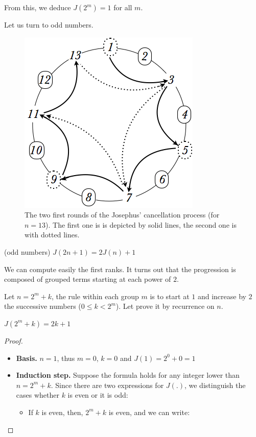 {{From this, we deduce $J(2^m)=1$ for all $m$.
\medskip

Let us turn to odd numbers.
\begin{figure}[h]
\begin{center}
        \includegraphics[scale=0.4]{FiguresMaths/josephus13}
        \caption{The two first rounds of the Josephus' cancellation process (for $n=13$).
        The first one is is depicted by solid lines, the second one is with dotted lines.}
        \label{fig:josephus13}
\end{center}
\end{figure}
\medskip

\begin{prop} (odd numbers)
$J(2n+1) = 2J(n)+1$ 
\end{prop}

We can compute easily the first ranks.
It turns out that the progression is composed of grouped terms starting at each power of $2$. 


Let $n=2^m+k$, the rule within each group $m$ is to start at $1$ and increase by $2$ the successive numbers
($0 \leq k < 2^m$).
Let prove it by recurrence on $n$.
\medskip

\begin{prop}
$J(2^m+k) = 2k+1$ 
\end{prop}

\begin{proof}
\begin{itemize}
\item {\bf Basis.} 
$n=1$, thus $m=0$, $k=0$ and $J(1) = 2^0+0 = 1$
\item {\bf Induction step.} 
Suppose the formula holds for any integer lower than $n=2^m+k$. 
Since there are two expressions for $J(.)$, we distinguish the cases whether $k$ is even or it is odd:
\begin{itemize}
\item If $k$ is even, then, $2^m+k$ is even, and we can write:


\end{itemize}
\end{itemize}
\end{proof}}}
